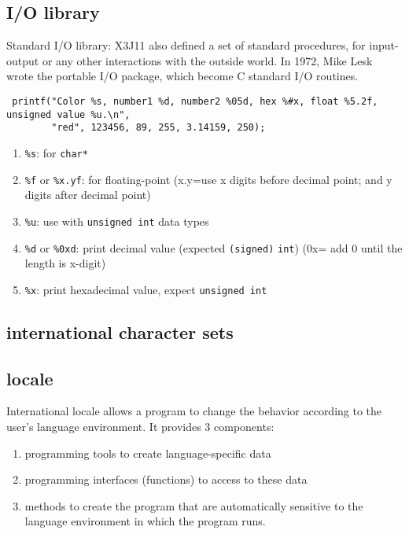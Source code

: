 \subsection{I/O library}
\label{sec:C89_IO}

Standard I/O library: X3J11 also  defined a set of standard procedures, for
input-output or any other interactions with the outside world. In 1972, Mike
Lesk wrote the portable I/O package, which become C standard I/O routines.

\begin{lstlisting}
 printf("Color %s, number1 %d, number2 %05d, hex %#x, float %5.2f, unsigned value %u.\n",
        "red", 123456, 89, 255, 3.14159, 250);
\end{lstlisting}
\begin{enumerate}
  \item \verb!%s!: for \verb!char*! 
  \item \verb!%f! or \verb!%x.yf!: for floating-point (x.y=use x digits before
  decimal point; and y digits after decimal point)
  \item \verb!%u!: use with \verb!unsigned int! data types
  \item \verb!%d! or \verb!%0xd!: print decimal value (expected \verb!(signed)!
   \verb!int!) (0x= add 0
   until the length is  x-digit)
  \item \verb!%x!: print hexadecimal value, expect \verb!unsigned int!
\end{enumerate}  

\subsection{international character sets}

\subsection{locale}
\label{sec:C89_locale}

International locale allows a program to change the behavior according to the
user's language environment. It provides 3 components:
\begin{enumerate}
  \item programming tools to create language-specific data
  \item programming interfaces (functions)  to access to these data
  \item methods to create the program that are automatically sensitive to the
  language environment in which the program runs.
\end{enumerate}

